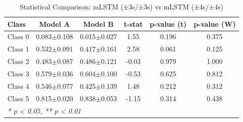 \begin{table}[htbp]
\centering
\caption{Statistical Comparison: mLSTM (±3s/±3s) vs mLSTM (±4s/±4s)}
\label{tab:comparison_class_mlstm_±3s_±3s_vs_mlstm_±4s_±4s}
\begin{tabular}{lccccc}
\toprule
\textbf{Class} & \textbf{Model A} & \textbf{Model B} & \textbf{t-stat} & \textbf{p-value (t)} & \textbf{p-value (W)} \\
\midrule
Class 0 & 0.083$\pm$0.108 & 0.015$\pm$0.027 & 1.55 & 0.196 & 0.375 \\
Class 1 & 0.532$\pm$0.091 & 0.417$\pm$0.161 & 2.58 & 0.061 & 0.125 \\
Class 2 & 0.483$\pm$0.087 & 0.486$\pm$0.121 & -0.03 & 0.979 & 1.000 \\
Class 3 & 0.579$\pm$0.036 & 0.604$\pm$0.100 & -0.53 & 0.625 & 0.812 \\
Class 4 & 0.546$\pm$0.077 & 0.425$\pm$0.139 & 1.48 & 0.212 & 0.312 \\
Class 5 & 0.815$\pm$0.020 & 0.838$\pm$0.053 & -1.15 & 0.314 & 0.438 \\
\bottomrule
\multicolumn{6}{l}{\textit{* p < 0.05, ** p < 0.01}} \\
\end{tabular}
\end{table}